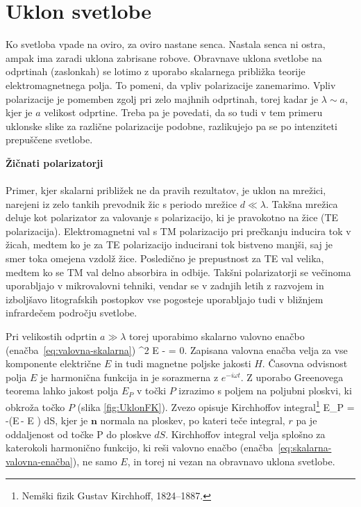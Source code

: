 \section{Uklon svetlobe}
Ko svetloba vpade na oviro, za oviro nastane senca. Nastala senca ni ostra, ampak
ima zaradi uklona zabrisane robove. Obravnave 
uklona svetlobe na odprtinah (zaslonkah) se lotimo z uporabo
skalarnega približka teorije elektromagnetnega polja. To pomeni, da vpliv 
polarizacije zanemarimo. Vpliv polarizacije je pomemben zgolj pri zelo majhnih odprtinah, 
torej kadar je $\lambda\sim a$, kjer je $a$ velikost
odprtine. Treba pa je povedati, da so tudi v tem primeru uklonske slike za 
različne polarizacije podobne, razlikujejo pa se po intenziteti prepuščene svetlobe.

\begin{remark}{{\bf Žičnati polarizatorji}}\\ \\
Primer, kjer skalarni približek ne da pravih rezultatov, je uklon na mrežici, narejeni 
iz zelo tankih prevodnik žic s periodo mrežice $d\ll \lambda$. Takšna mrežica 
deluje kot polarizator za valovanje s polarizacijo, ki je pravokotno na žice (TE polarizacija). 
Elektromagnetni val s TM polarizacijo pri prečkanju inducira tok v žicah, medtem
ko je za TE polarizacijo inducirani tok bistveno manjši, saj je smer toka omejena
vzdolž žice. Posledično je prepustnost za TE val velika, medtem ko se TM val delno
absorbira in odbije. Takšni polarizatorji se večinoma uporabljajo v mikrovalovni tehniki, 
vendar se v zadnjih letih z razvojem in izboljšavo litografskih postopkov
vse pogosteje uporabljajo tudi v bližnjem infrardečem področju svetlobe.
\end{remark}

Pri velikostih odprtin $a\gg\lambda$ torej uporabimo skalarno valovno enačbo 
(enačba~\ref{eq:valovna-skalarna})
\beq
\nabla^2 E -  = 0.
\label{eq:skalarna-valovna-enačba}
\eeq
Zapisana valovna enačba velja za vse komponente električne $E$ in tudi 
magnetne poljske jakosti $H$. Časovna odvisnost polja $E$ je harmonična funkcija in 
je sorazmerna z $e^{-i \omega t}$. Z uporabo Greenovega teorema lahko 
jakost polja $E_P$ v točki $P$ izrazimo s poljem na poljubni ploskvi, ki obkroža točko $P$ (slika \ref{fig:UklonFK}). 
Zvezo opisuje Kirchhoffov integral\footnote{Nemški fizik Gustav Kirchhoff, 1824--1887.} 
\beq
E_P = -\oint \left(E\,\cdot \nabla {}-
\cdot \nabla E \right) dS,
\label{eq:Kirchhoffov-integral}
\eeq
kjer je $\mathbf{n}$ normala na ploskev, po kateri teče integral, $r$ pa je oddaljenost od točke P
do ploskve $dS$. Kirchhoffov integral velja splošno za katerokoli harmonično 
funkcijo, ki reši valovno enačbo (enačba~\ref{eq:skalarna-valovna-enačba}), ne samo $E$, in torej
ni vezan na obravnavo uklona svetlobe. 

